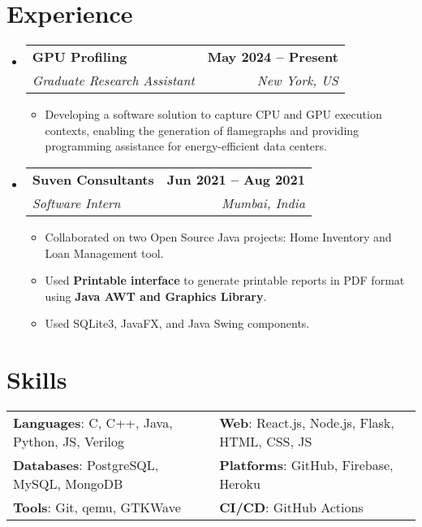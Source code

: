 \documentclass[letterpaper,11pt]{article}
\makeatletter
\newcommand{\resumeItem}[1]{
  \item\small{
    {#1 \vspace{-2pt}}
  }
}
\newcommand{\resumeSubheading}[4]{
  \vspace{-2pt}\item
    \begin{tabular*}{1.0\textwidth}[t]{l@{\extracolsep{\fill}}r}
      \vspace{-2pt}\textbf{#1} & \textbf{\small #2} \\
      \textit{\small#3} & \textit{\small #4} \\
    \end{tabular*}\vspace{-7pt}
}
\newcommand{\resumeSubHeadingListStart}{\begin{itemize}[leftmargin=0.0in, label={}]}
\newcommand{\resumeSubHeadingListEnd}{\end{itemize}}
\newcommand{\resumeItemListStart}{\begin{itemize}}
\newcommand{\resumeItemListEnd}{\end{itemize}\vspace{-5pt}}
\makeatother
\begin{document}
\section{Experience}
    \resumeSubHeadingListStart
    \vspace{-2pt}

            \resumeSubheading
            {GPU Profiling}{May 2024 -- Present}
            {Graduate Research Assistant}{New York, US}
            \resumeItemListStart
                \resumeItem{Developing a software solution to capture CPU and GPU execution contexts, enabling the generation of flamegraphs and providing programming assistance for energy-efficient data centers.}
            \resumeItemListEnd
        \vspace{-3pt}
        
        \resumeSubheading
            {Suven Consultants}{Jun 2021 -- Aug 2021}
            {Software Intern}{Mumbai, India}
            \resumeItemListStart
                \resumeItem{Collaborated on two Open Source Java projects: Home Inventory and Loan Management tool.}
                \resumeItem{Used \textbf{Printable interface} to generate printable reports in PDF format using \textbf{Java AWT and Graphics Library}.}
                \resumeItem{Used SQLite3, JavaFX, and Java Swing components.}
            \resumeItemListEnd
        \vspace{-3pt}
    \resumeSubHeadingListEnd
\vspace{-18pt}



\section{Skills}
    \vspace{-4pt}
    \begin{itemize}[leftmargin=0.2in, label={}]
        {\item{
            \begin{tabular}{ l@{\hskip 0.2in} l }
                 \textbf{Languages}: C, C++, Java, Python, JS, Verilog & \textbf{Web}: React.js, Node.js, Flask, HTML, CSS, JS  \\ 
                 \textbf{Databases}: PostgreSQL, MySQL, MongoDB & \textbf{Platforms}: GitHub, Firebase, Heroku \\  
                 \textbf{Tools}: Git, qemu, GTKWave & \textbf{CI/CD}: GitHub Actions
            \end{tabular}
        }}
    \end{itemize}
\vspace{-22pt}
\end{document}
